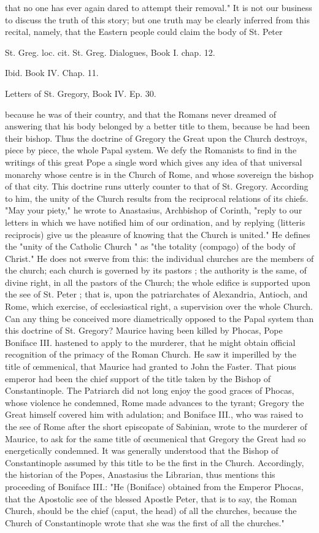 that no one has ever again dared to attempt their removal." It is not our business to discuss the truth of this story; but one truth may be clearly inferred from this recital, namely, that the Eastern people could claim the body of St. Peter

St. Greg. loc. cit. St. Greg. Dialogues, Book I. chap. 12.

Ibid. Book IV. Chap. 11.

Letters of St. Gregory, Book IV. Ep. 30.

because he was of their country, and that the Romans never dreamed of answering that his body belonged by a better title to them, because be had been their bishop. Thus the doctrine of Gregory the Great upon the Church destroys, piece by piece, the whole Papal system. We defy the Romanists to find in the writings of this great Pope a single word which gives any idea of that universal monarchy whose centre is in the Church of Rome, and whose sovereign the bishop of that city. This doctrine runs utterly counter to that of St. Gregory. According to him, the unity of the Church results from the reciprocal relations of its chiefs. "May your piety," he wrote to Anastasius, Archbishop of Corinth, "reply to our letters in which we have notified him of our ordination, and by replying (litteris reciprocis) give us the pleasure of knowing that the Church is united." He defines the "unity of the Catholic Church " as "the totality (compago) of the body of Christ." He does not swerve from this: the individual churches are the members of the church; each church is governed by its pastors ; the authority is the same, of divine right, in all the pastors of the Church; the whole edifice is supported upon the see of St. Peter ; that is, upon the patriarchates of Alexandria, Antioch, and Rome, which exercise, of ecclesiastical right, a supervision over the whole Church. Can any thing be conceived more diametrically opposed to the Papal system than this doctrine of St. Gregory? Maurice having been killed by Phocas, Pope Boniface III. hastened to apply to the murderer, that he might obtain official recognition of the primacy of the Roman Church. He saw it imperilled by the title of œmmenical, that Maurice had granted to John the Faster. That pious emperor had been the chief support of the title taken by the Bishop of Constantinople. The Patriarch did not long enjoy the good graces of Phocas, whose violence he condemned, Rome made advances to the tyrant; Gregory the Great himself covered him with adulation; and Boniface III., who was raised to the see of Rome after the short episcopate of Sabinian, wrote to the murderer of Maurice, to ask for the same title of œcumenical that Gregory the Great had so energetically condemned. It was generally understood that the Bishop of Constantinople assumed by this title to be the first in the Church. Accordingly, the historian of the Popes, Anastasius the Librarian, thus mentions this proceeding of Boniface III.: "He (Boniface) obtained from the Emperor Phocas, that the Apostolic see of the blessed Apostle Peter, that is to say, the Roman Church, should be the chief (caput, the head) of all the churches, because the Church of Constantinople wrote that she was the first of all the churches." 